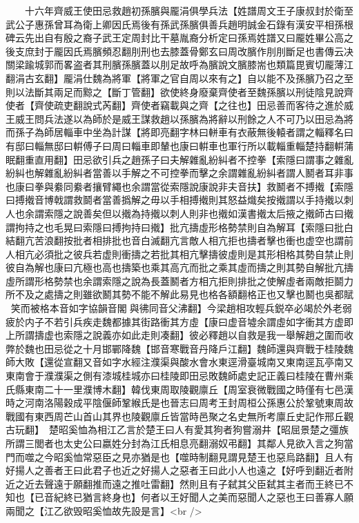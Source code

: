 　　十六年齊威王使田忌救趙初孫臏與龎涓俱學兵法【姓譜周文王子康叔封於衛至武公子惠孫曾耳為衛上卿因氏焉後有孫武孫臏俱善兵趙明誠金石錄有漢安平相孫根碑云先出自有殷之裔子武王定周封比干墓胤裔分析定曰孫焉姓譜又曰龎姓畢公高之後支庶封于龎因氏焉臏頻忍翻刖刑也去膝蓋骨鄭玄曰周改臏作刖刖斷足也書傳云决關梁踰城郭而畧盗者其刑臏孫臏蓋以刖足故呼為臏說文臏膝耑也類篇毘賓切龎薄江翻涓古玄翻】龎涓仕魏為將軍【將軍之官自周以來有之】自以能不及孫臏乃召之至則以法斷其兩足而黥之【斷丁管翻】欲使終身廢棄齊使者至魏孫臏以刑徒陰見說齊使者【齊使疏吏翻說式芮翻】齊使者竊載與之齊【之往也】田忌善而客待之進於威王威王問兵法遂以為師於是威王謀救趙以孫臏為將辭以刑餘之人不可乃以田忌為將而孫子為師居輜車中坐為計謀【將即亮翻字林曰軿車有衣蔽無後轅者謂之輜釋名曰有邸曰輜無邸曰輧傅子曰周曰輜車即輦也康曰輧車也軍行所以載輜重輜楚持翻輧蒲眠翻重直用翻】田忌欲引兵之趙孫子曰夫解雜亂紛糾者不控拳【索隱曰謂事之雜亂紛糾也解雜亂紛糾者當善以手解之不可控拳而擊之余謂雜亂紛糾者謂人鬭者耳非事也康曰拳與絭同絭者攘臂繩也余謂當從索隱說康說非夫音扶】救鬭者不搏撠【索隱曰搏撠音博戟謂救鬬者當善撝解之毋以手相搏撠則其怒益熾矣按撠謂以手持撠以刺人也余謂索隱之說善矣但以撠為持撠以刺人則非也撠如漢書撠太后掖之撠師古曰撠謂拘持之也毛晃曰索隱曰搏拘持曰撠】批亢擣虛形格勢禁則自為解耳【索隱曰批白結翻亢苦浪翻按批者相排批也音白滅翻亢言敵人相亢拒也擣者擊也衝也虚空也謂前人相亢必須批之彼兵若虚則衝擣之若批其相亢擊擣彼虛則是其形相格其勢自禁止則彼自為解也康曰亢極也高也擣築也乘其高亢而批之乘其虛而擣之則其勢自解批亢擣虛所謂形格勢禁也余謂索隱之說為長蓋鬭者方相亢拒則排批之使解虛者兩敵拒鬬力所不及之處擣之則雖欲鬭其勢不能不解此易見也格各額翻格正也又擊也鬭也吳都賦笑而被格本音如字協韻音閣與彿同音父沸翻】今梁趙相攻輕兵鋭卒必竭於外老弱疲於内子不若引兵疾走魏都據其街路衝其方虛【康曰虚音墟余謂虛如字衝其方虚即上所謂擣虚也索隱之說義亦如此走則凑翻】彼必釋趙以自救是我一舉解趙之圍而收弊於魏也田忌從之十月邯鄲降魏【邯音寒戰音丹降戶江翻】魏師還與齊戰于桂陵魏師大敗【還從宣翻又音如字水經注濮渠與酸水會水東逕滑臺城南又東南逕瓦亭南又東南會于濮濮渠之側有漆城桂城亦曰桂陵即田忌敗魏師處史記正義曰桂陵在曹州乘氏縣東南二十一里濮博木翻】韓伐東周取陵觀廪丘【周室衰微戰國之時僅有七邑漢時之河南洛陽穀成平陰偃師鞏緱氏是也晉志曰周考王封周桓公孫惠公於鞏號東周故戰國有東西周芒山首山其界也陵觀廪丘皆當時邑聚之名史無所考廪丘史記作邢丘觀古玩翻】　楚昭奚恤為相江乙言於楚王曰人有愛其狗者狗嘗溺井【昭屈景楚之彊族所謂三閭者也太史公曰嬴姓分封為江氏相息亮翻溺奴弔翻】其鄰人見欲入言之狗當門而噬之今昭奚恤常惡臣之見亦猶是也【噬時制翻見謂見楚王也惡烏路翻】且人有好揚人之善者王曰此君子也近之好揚人之惡者王曰此小人也遠之【好呼到翻近者附近之近去聲遠于願翻推而遠之推吐雷翻】然則且有子弑其父臣弑其主者而王終已不知也【已音紀終已猶言終身也】何者以王好聞人之美而惡聞人之惡也王曰善寡人願兩聞之【江乙欲毁昭奚恤故先設是言】<br />
